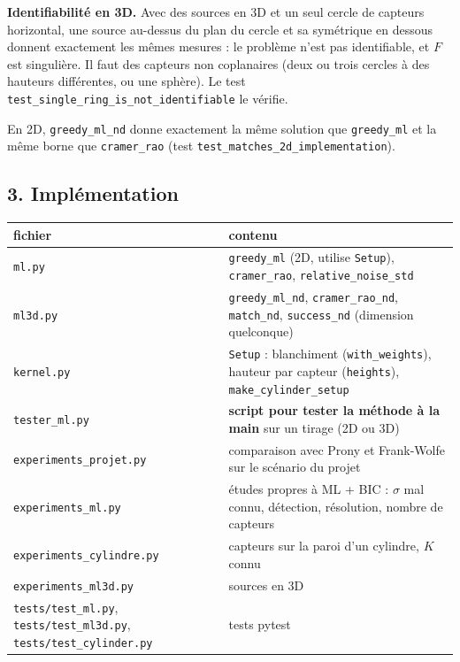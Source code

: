 \documentclass[
  french,
]{article}
\newcounter{none} %
\begin{document}
\textbf{Identifiabilité en 3D.} Avec des sources en 3D et un seul cercle
de capteurs horizontal, une source au-dessus du plan du cercle et sa
symétrique en dessous donnent exactement les mêmes mesures : le problème
n'est pas identifiable, et \(F\) est singulière. Il faut des capteurs
non coplanaires (deux ou trois cercles à des hauteurs différentes, ou
une sphère). Le test \texttt{test\_single\_ring\_is\_not\_identifiable}
le vérifie.

En 2D, \texttt{greedy\_ml\_nd} donne exactement la même solution que
\texttt{greedy\_ml} et la même borne que \texttt{cramer\_rao} (test
\texttt{test\_matches\_2d\_implementation}).

\subsection{3. Implémentation}\label{impluxe9mentation}

{\def\LTcaptype{none} %
\begin{longtable}[]{@{}
  >{\raggedright\arraybackslash}p{}
  >{\raggedright\arraybackslash}p{}@{}}
\toprule\noalign{}
\begin{minipage}[b]{\linewidth}\raggedright
fichier
\end{minipage} & \begin{minipage}[b]{\linewidth}\raggedright
contenu
\end{minipage} \\
\midrule\noalign{}
\endhead
\bottomrule\noalign{}
\endlastfoot
\texttt{ml.py} & \texttt{greedy\_ml} (2D, utilise \texttt{Setup}),
\texttt{cramer\_rao}, \texttt{relative\_noise\_std} \\
\texttt{ml3d.py} & \texttt{greedy\_ml\_nd}, \texttt{cramer\_rao\_nd},
\texttt{match\_nd}, \texttt{success\_nd} (dimension quelconque) \\
\texttt{kernel.py} & \texttt{Setup} : blanchiment
(\texttt{with\_weights}), hauteur par capteur (\texttt{heights}),
\texttt{make\_cylinder\_setup} \\
\texttt{tester\_ml.py} & \textbf{script pour tester la méthode à la
main} sur un tirage (2D ou 3D) \\
\texttt{experiments\_projet.py} & comparaison avec Prony et Frank-Wolfe
sur le scénario du projet \\
\texttt{experiments\_ml.py} & études propres à ML + BIC : \(\sigma\) mal
connu, détection, résolution, nombre de capteurs \\
\texttt{experiments\_cylindre.py} & capteurs sur la paroi d'un cylindre,
\(K\) connu \\
\texttt{experiments\_ml3d.py} & sources en 3D \\
\texttt{tests/test\_ml.py}, \texttt{tests/test\_ml3d.py},
\texttt{tests/test\_cylinder.py} & tests pytest \\
\end{longtable}
}
\end{document}
